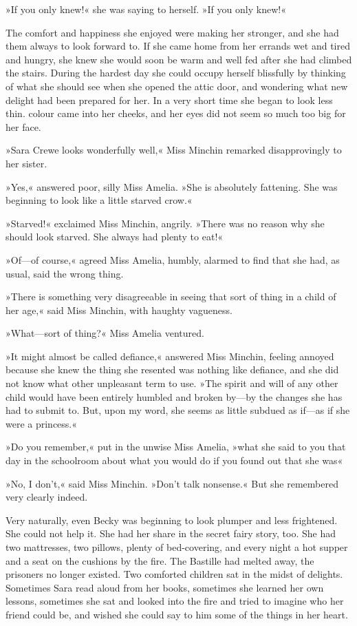 »If you only knew!« she was saying to herself. »If you only knew!«

The comfort and happiness she enjoyed were making her stronger, and she had them always to look forward to. If she came home from her errands wet and tired and hungry, she knew she would soon be warm and well fed after she had climbed the stairs. During the hardest day she could occupy herself blissfully by thinking of what she should see when she opened the attic door, and wondering what new delight had been prepared for her. In a very short time she began to look less thin. colour came into her cheeks, and her eyes did not seem so much too big for her face.

»Sara Crewe looks wonderfully well,« Miss Minchin remarked disapprovingly to her sister.

»Yes,« answered poor, silly Miss Amelia. »She is absolutely fattening. She was beginning to look like a little starved crow.«

»Starved!« exclaimed Miss Minchin, angrily. »There was no reason why she should look starved. She always had plenty to eat!«

»Of—of course,« agreed Miss Amelia, humbly, alarmed to find that she had, as usual, said the wrong thing.

»There is something very disagreeable in seeing that sort of thing in a child of her age,« said Miss Minchin, with haughty vagueness.

»What—sort of thing?« Miss Amelia ventured.

»It might almost be called defiance,« answered Miss Minchin, feeling annoyed because she knew the thing she resented was nothing like defiance, and she did not know what other unpleasant term to use. »The spirit and will of any other child would have been entirely humbled and broken by—by the changes she has had to submit to. But, upon my word, she seems as little subdued as if—as if she were a princess.«

»Do you remember,« put in the unwise Miss Amelia, »what she said to you that day in the schoolroom about what you would do if you found out that she was\longdash«

»No, I don't,« said Miss Minchin. »Don't talk nonsense.« But she remembered very clearly indeed.

Very naturally, even Becky was beginning to look plumper and less frightened. She could not help it. She had her share in the secret fairy story, too. She had two mattresses, two pillows, plenty of bed-covering, and every night a hot supper and a seat on the cushions by the fire. The Bastille had melted away, the prisoners no longer existed. Two comforted children sat in the midst of delights. Sometimes Sara read aloud from her books, sometimes she learned her own lessons, sometimes she sat and looked into the fire and tried to imagine who her friend could be, and wished she could say to him some of the things in her heart.

